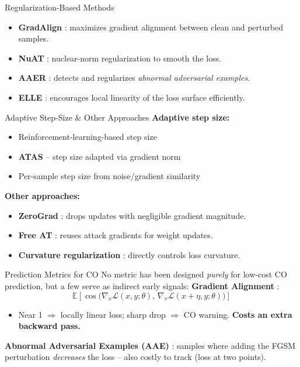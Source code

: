 \documentclass[11pt,aspectratio=169]{beamer}
\begin{document}
\begin{frame}{Regularization-Based Methods}
  \begin{itemize}
    \item \textbf{GradAlign} \cite{andriushchenko2020understanding}: maximizes gradient alignment between clean and perturbed samples.
    \item \textbf{NuAT} \cite{sriramanan2021towards}: nuclear-norm regularization to smooth the loss.
    \item \textbf{AAER} \cite{lin2023eliminating}: detects and regularizes \emph{abnormal adversarial examples}.
    \item \textbf{ELLE} \cite{rocamora2024efficient}: encourages local linearity of the loss surface efficiently.
  \end{itemize}
\end{frame}

\begin{frame}{Adaptive Step-Size \& Other Approaches}
  \textbf{Adaptive step size:}
  \begin{itemize}
    \item Reinforcement-learning-based step size \cite{nie2021adaptive}
    \item \textbf{ATAS} -- step size adapted via gradient norm \cite{huang2023fast}
    \item Per-sample step size from noise/gradient similarity \cite{zhao2025avoiding}
  \end{itemize}
  \textbf{Other approaches:}
  \begin{itemize}
    \item \textbf{ZeroGrad} \cite{golgooni2023zerograd}: drops updates with negligible gradient magnitude.
    \item \textbf{Free AT} \cite{shafahi2019adversarial}: reuses attack gradients for weight updates.
    \item \textbf{Curvature regularization} \cite{moosavi2019robustness}: directly controls loss curvature.
  \end{itemize}
\end{frame}

\begin{frame}{Prediction Metrics for CO}
  No metric has been designed \emph{purely} for low-cost CO prediction, but a few serve as indirect early signals:
  \vskip 0.15cm
  \textbf{Gradient Alignment} \cite{andriushchenko2020understanding}:
  \[
  \mathbb{E}\left[ \cos\big( \nabla_x \mathcal{L}(x,y;\theta),\, \nabla_x \mathcal{L}(x+\eta,y;\theta) \big) \right]
  \]
  \begin{itemize}
    \item Near 1 $\Rightarrow$ locally linear loss; sharp drop $\Rightarrow$ CO warning. \textbf{Costs an extra backward pass.}
  \end{itemize}
  \textbf{Abnormal Adversarial Examples (AAE)} \cite{lin2023eliminating}: samples where adding the FGSM perturbation \emph{decreases} the loss -- also costly to track (loss at two points).
\end{frame}
\end{document}
